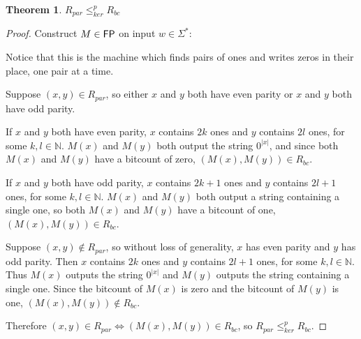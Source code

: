 \documentclass{amsart}
\newtheorem{theorem}{Theorem}[section]
\theoremstyle{definition} \newtheorem{definition}[definition]{Definition}
\newcommand{\sigmastar}{\Sigma^{*}} %
\newcommand{\kr}{\leq^{p}_{ker}} %
\begin{document}
\begin{theorem}$R_{par}\kr R_{bc}$\end{theorem}
\begin{proof}
  Construct $M\in {\ensuremath{\mathsf{FP}}}$ on input $w\in\sigmastar$:\\
  \begin{algorithm}[H]
  \end{algorithm}
  Notice that this is the machine which finds pairs of ones and writes zeros in
  their place, one pair at a time.

  Suppose $(x, y)\in R_{par}$, so either $x$ and $y$ both have even parity or
  $x$ and $y$ both have odd parity.
  
  If $x$ and $y$ both have even parity, $x$ contains $2k$ ones and $y$ contains
  $2l$ ones, for some $k,l\in\mathbb{N}$. $M(x)$ and $M(y)$ both output the
  string $0^{|x|}$, and since both $M(x)$ and $M(y)$ have a bitcount of zero,
  $(M(x), M(y))\in R_{bc}$.

  If $x$ and $y$ both have odd parity, $x$ contains $2k+1$ ones and $y$
  contains $2l+1$ ones, for some $k,l\in\mathbb{N}$. $M(x)$ and $M(y)$ both
  output a string containing a single one, so both $M(x)$ and $M(y)$ have a
  bitcount of one, $(M(x), M(y))\in R_{bc}$.

  Suppose $(x, y)\notin R_{par}$, so without loss of generality, $x$ has even
  parity and $y$ has odd parity. Then $x$ contains $2k$ ones and $y$ contains
  $2l+1$ ones, for some $k,l\in\mathbb{N}$. Thus $M(x)$ outputs the string
  $0^{|x|}$ and $M(y)$ outputs the string containing a single one. Since the
  bitcount of $M(x)$ is zero and the bitcount of $M(y)$ is one,
  $(M(x), M(y))\notin R_{bc}$.

  Therefore $(x, y)\in R_{par} \iff (M(x), M(y))\in R_{bc}$, so
  $R_{par} \kr R_{bc}$.
\end{proof}
\end{document}
